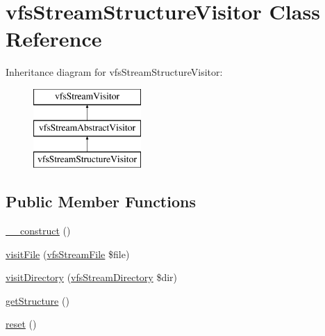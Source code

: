 \hypertarget{classorg_1_1bovigo_1_1vfs_1_1visitor_1_1vfs_stream_structure_visitor}{}\section{vfs\+Stream\+Structure\+Visitor Class Reference}
\label{classorg_1_1bovigo_1_1vfs_1_1visitor_1_1vfs_stream_structure_visitor}
Inheritance diagram for vfs\+Stream\+Structure\+Visitor\+:\begin{figure}[H]
\begin{center}
\leavevmode
\includegraphics[height=3.000000cm]{classorg_1_1bovigo_1_1vfs_1_1visitor_1_1vfs_stream_structure_visitor}
\end{center}
\end{figure}
\subsection*{Public Member Functions}
\begin{DoxyCompactItemize}
\item 
\mbox{\hyperlink{classorg_1_1bovigo_1_1vfs_1_1visitor_1_1vfs_stream_structure_visitor_a095c5d389db211932136b53f25f39685}{\+\_\+\+\_\+construct}} ()
\item 
\mbox{\hyperlink{classorg_1_1bovigo_1_1vfs_1_1visitor_1_1vfs_stream_structure_visitor_aefbf1a8429cc874e03034c19eeba5a07}{visit\+File}} (\mbox{\hyperlink{classorg_1_1bovigo_1_1vfs_1_1vfs_stream_file}{vfs\+Stream\+File}} \$file)
\item 
\mbox{\hyperlink{classorg_1_1bovigo_1_1vfs_1_1visitor_1_1vfs_stream_structure_visitor_a58aba2b3abdff052e38254bba19aac72}{visit\+Directory}} (\mbox{\hyperlink{classorg_1_1bovigo_1_1vfs_1_1vfs_stream_directory}{vfs\+Stream\+Directory}} \$dir)
\item 
\mbox{\hyperlink{classorg_1_1bovigo_1_1vfs_1_1visitor_1_1vfs_stream_structure_visitor_ac039a7d66b72b41cbc80f4507d254f68}{get\+Structure}} ()
\item 
\mbox{\hyperlink{classorg_1_1bovigo_1_1vfs_1_1visitor_1_1vfs_stream_structure_visitor_a4a20559544fdf4dcb457e258dc976cf8}{reset}} ()
\end{DoxyCompactItemize}
